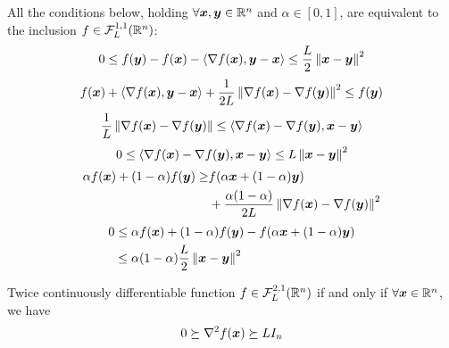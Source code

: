 \begin{theorem}
    All the conditions below, holding $\forall \bm{x},\bm{y}\in\mathbb{R}^n$ and $\alpha\in[0,1]$, are equivalent to the inclusion $f\in\mathcal{F}_L^{1,1}(\mathbb{R}^n)$:
    \begin{equation}
        0\le f(\bm{y})-f(\bm x)-\braket{\nabla f(\bm x),\bm{y}-\bm{x}}\le \frac{L}{2}\left\lVert\bm{x}-\bm{y}\right\rVert^2
    \end{equation}
    \begin{equation}
        f(\bm{x})+\braket{\nabla f(\bm x),\bm{y}-\bm{x}}+\frac{1}{2L}\left\lVert\nabla f(\bm{x})-\nabla f(\bm{y})\right\rVert^2\le f(\bm{y}) 
    \end{equation}
    \begin{equation}
        \frac{1}{L}\left\lVert\nabla f(\bm{x})-\nabla f(\bm{y})\right\rVert\le \braket{\nabla f(\bm{x})-\nabla f(\bm{y}), \bm{x}-\bm{y}}
    \end{equation}
    \begin{equation}
        0\le  \braket{\nabla f(\bm{x})-\nabla f(\bm{y}), \bm{x}-\bm{y}} \le L\left\lVert\bm{x}-\bm{y}\right\rVert^2
    \end{equation}
    \begin{equation}
        \begin{aligned}
            \alpha f(\bm{x})+(1-\alpha)f(\bm{y})\ge& f(\alpha \bm{x}+(1-\alpha)\bm{y})\\
            &+\frac{\alpha(1-\alpha)}{2L}\left\lVert\nabla f(\bm{x})-\nabla f(\bm{y})\right\rVert^2 
        \end{aligned}
    \end{equation}
    \begin{equation}
        \begin{aligned}
            0&\le \alpha f(\bm{x})+(1-\alpha)f(\bm{y})- f(\alpha \bm{x}+(1-\alpha)\bm{y})\\
            &\le \alpha(1-\alpha)\frac{L}{2}\left\lVert\bm{x}-\bm{y}\right\rVert^2
        \end{aligned}
    \end{equation}
\end{theorem}



\begin{theorem}
    Twice continuously differentiable function $f\in \mathcal{F}_L^{2,1}(\mathbb{R}^n)$ if and only if $\forall \bm{x} \in \mathbb{R}^n$, we have
    \begin{align*}
        0\succeq \nabla^2 f(\bm{x})\succeq LI_n
    \end{align*}
\end{theorem}

